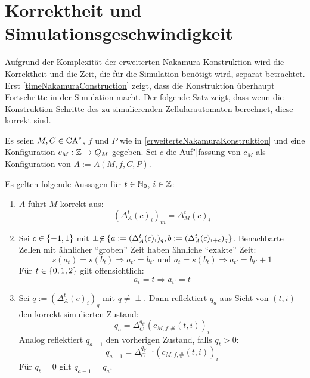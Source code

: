 \section{Korrektheit und Simulationsgeschwindigkeit}

Aufgrund der Komplexität der erweiterten Nakamura-Konstruktion wird die Korrektheit
und die Zeit, die für die Simulation benötigt wird, separat betrachtet.
Erst \cref{timeNakamuraConstruction} zeigt, dass die Konstruktion überhaupt Fortschritte in der Simulation macht.
Der folgende Satz zeigt, dass wenn die Konstruktion Schritte des zu simulierenden Zellularautomaten berechnet, diese korrekt sind.

\begin{satz}
    \label{nakamura_korrektheit}
    Es seien $M, C \in \textrm{CA}^*$, $f$ und $P$ wie in \cref{erweiterteNakamuraKonstruktion} und eine Konfiguration $c_M: \mathbb{Z} \to Q_M$ gegeben.
    Sei $c$ die Auf"|fassung von $c_M$ als Konfiguration von $A := A(M, f, C, P)$.
    
    Es gelten folgende Aussagen für $t \in \mathbb{N}_0$, $i \in \mathbb{Z}$:
    
    \begin{enumerate}
        \item
            $A$ führt $M$ korrekt aus:
            \[
                (\Delta_A^t(c)_i)_m = \Delta_M^t(c)_i
            \]
        \item
            Sei $c \in \{ {-1, 1} \}$ mit $\perp \not \in \{ {a := (\Delta_A^t(c)_i)_q, b := (\Delta_A^t(c)_{i+c})_q} \}$.
            Benachbarte Zellen mit ähnlicher \enquote{groben} Zeit haben ähnliche \enquote{exakte} Zeit:
            \[
                s(a_{t}) = s(b_{t}) \Rightarrow a_{t'} = b_{t'} \text{ und }  a_{t} = s(b_{t}) \Rightarrow a_{t'} = b_{t'} + 1
            \]
            Für $t \in \{ {0, 1, 2} \}$ gilt offensichtlich:
            \[
                a_{t} = t \Rightarrow a_{t'} = t
            \]
        \item
            Sei $q := (\Delta_A^t(c)_i)_q$ mit $q \neq \perp$.
            Dann reflektiert $q_a$ aus Sicht von $(t, i)$ den korrekt simulierten Zustand:
            \[
                q_a = \Delta_C^{q_{t'}}(c_{M, f, \#}(t, i))_i
            \]
            Analog reflektiert $q_{a-1}$ den vorherigen Zustand, falls $q_t > 0$:
            \[
                q_{a-1} = \Delta_C^{q_{t' - 1}}(c_{M, f, \#}(t, i))_i
            \]
            Für $q_t = 0$ gilt $q_{a-1} = q_a$.
    \end{enumerate}
\end{satz}
